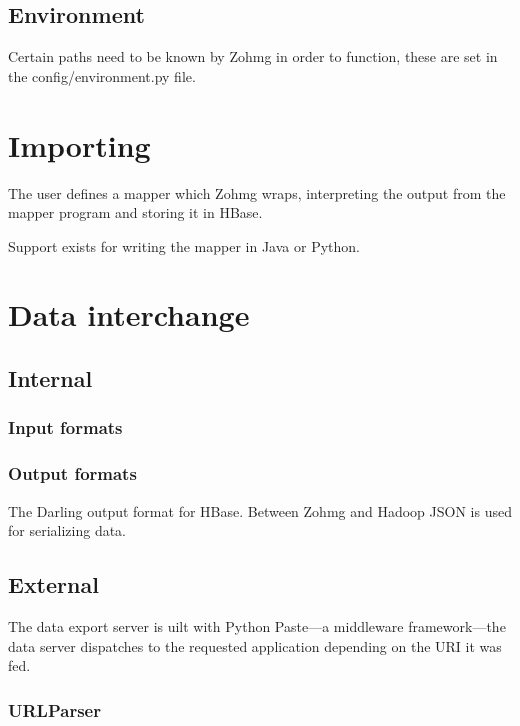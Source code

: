 \documentclass[a4paper,10pt]{book}
\begin{document}
\subsection{Environment}

Certain paths need to be known by Zohmg in order to function, these are set
in the config/environment.py file.



\section{Importing}

The user defines a mapper which Zohmg wraps, interpreting the output from the
mapper program and storing it in HBase.

Support exists for writing the mapper in Java or Python.



\section{Data interchange}

\subsection{Internal}

\subsubsection{Input formats}

\subsubsection{Output formats}

The Darling output format for HBase. Between Zohmg and Hadoop JSON is used
for serializing data.


\subsection{External}

The data export server is uilt with Python Paste---a middleware
framework---the data server dispatches to the requested application
depending on the URI it was fed.


\subsubsection{URLParser}
\end{document}
